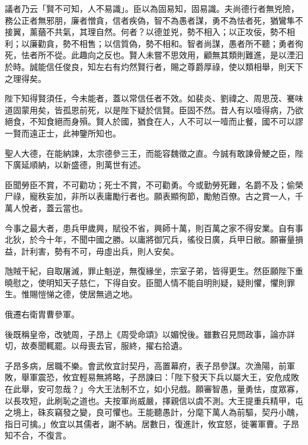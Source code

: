 \begin{pinyinscope}
 議者乃云「賢不可知，人不易識」。臣以為固易知，固易識。夫尚德行者無兇險，務公正者無邪朋，廉者憎貪，信者疾偽，智不為愚者謀，勇不為怯者死，猶鸞隼不接翼，薰蕕不共氣，其理自然。何者？以德並兇，勢不相入；以正攻佞，勢不相利；以廉勸貪，勢不相售；以信質偽，勢不相和。智者尚謀，愚者所不聽；勇者徇死，怯者所不從。此趣向之反也。賢人未嘗不思效用，顧無其類則難進，是以湮汩於時。誠能信任俊良，知左右有灼然賢行者，賜之尊爵厚祿，使以類相舉，則天下之理得矣。



 陛下知得賢須任，今未能者，蓋以常信任者不效。如裴炎、劉禕之、周思茂、騫味道固蒙用矣，皆孤恩前死，以是陛下疑於信賢。臣固不然。昔人有以噎得病，乃欲絕食，不知食絕而身殞。賢人於國，猶食在人，人不可以一噎而止餐，國不可以謬一賢而遠正士，此神鑒所知也。



 聖人大德，在能納諫，太宗德參三王，而能容魏徵之直。今誠有敢諫骨鯁之臣，陛下廣延順納，以新盛德，則萬世有述。



 臣聞勞臣不賞，不可勸功；死士不賞，不可勸勇。今或勤勞死難，名爵不及；偷榮尸祿，寵秩妄加，非所以表庸勵行者也。願表顯徇節，勵勉百僚。古之賞一人，千萬人悅者，蓋云當也。



 今事之最大者，患兵甲歲興，賦役不省，興師十萬，則百萬之家不得安業。自有事北狄，於今十年，不聞中國之勝。以庸將御冗兵，徭役日廣，兵甲日敝。願審量損益，計利害，勢有不可，毋虛出兵，則人安矣。



 虺賊干紀，自取屠滅，罪止魁逆，無復緣坐，宗室子弟，皆得更生。然臣願陛下重曉慰之，使明知天子慈仁，下得自安。臣聞人情不能自明則疑，疑則懼，懼則罪生。惟賜愷悌之德，使居無過之地。



 俄遷右衛胄曹參軍。



 後既稱皇帝，改號周，子昂上《周受命頌》以媚悅後。雖數召見問政事，論亦詳切，故奏聞輒罷。以母喪去官，服終，擢右拾遺。



 子昂多病，居職不樂。會武攸宜討契丹，高置幕府，表子昂參謀。次漁陽，前軍敗，舉軍震恐，攸宜輕易無將略，子昂諫曰：「陛下發天下兵以屬大王，安危成敗在此舉，安可忽哉？」今大王法制不立，如小兒戲。願審智愚，量勇怯，度眾寡，以長攻短，此刷恥之道也。夫按軍尚威嚴，擇親信以虞不測。大王提重兵精甲，屯之境上，硃亥竊發之變，良可懼也。王能聽愚計，分麾下萬人為前驅，契丹小醜，指日可擒。」攸宜以其儒者，謝不納。居數日，復進計，攸宜怒，徙署軍曹。子昂知不合，不復言。




\end{pinyinscope}
